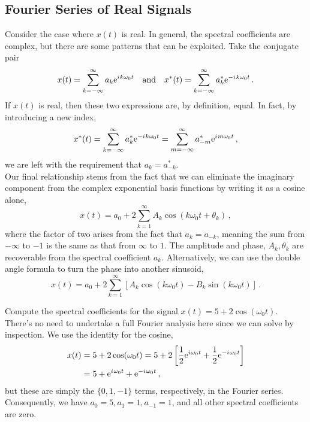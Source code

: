 \subsection{Fourier Series of Real Signals}
%
Consider the case where $x(t)$ is real. In general, the spectral coefficients are
complex, but there are some patterns that can be exploited. Take the conjugate pair
%
\begin{displaymath}
  x(t) = \sum_{k=-\infty}^\infty a_k \mathrm{e}^{{i\mkern1mu} k\omega_0 t}
  \quad\mathrm{and}\quad
  x^*(t) = \sum_{k=-\infty}^\infty a_k^* \mathrm{e}^{-{i\mkern1mu} k\omega_0 t} \,.
\end{displaymath}
%
If $x(t)$ is real, then these two expressions are, by definition, equal. In fact,
by introducing a new index,
%
\begin{displaymath}
  x^*(t) = \sum_{k=-\infty}^\infty a_k^*\mathrm{e}^{-{i\mkern1mu} k \omega_0 t}
  = \sum_{m=-\infty}^\infty a_{-m}^*\mathrm{e}^{{i\mkern1mu} m \omega_0 t} \,,
\end{displaymath}
%
we are left with the requirement that $a_k = a_{-k}^*$.\\
%
Our final relationship stems from the fact that we can eliminate the imaginary
component from the complex exponential basis functions by writing it as a cosine
alone,
%
\begin{displaymath}
  x(t) = a_0 + 2\sum_{k=1}^\infty A_k\cos(k\omega_0 t + \theta_k) \,,
\end{displaymath}
%
where the factor of two arises from the fact that $a_k = a_{-k}$, meaning the
sum from $-\infty$ to $-1$ is the same as that from $\infty$ to $1$. The amplitude
and phase, $A_k,\theta_k$ are recoverable from the spectral coefficient $a_k$.
Alternatively, we can use the double angle formula to turn the phase into
another sinusoid,
%
\begin{displaymath}
  x(t) = a_0 + 2\sum_{k=1}^\infty \left[A_k\cos(k\omega_0 t) - B_k\sin(k\omega_0 t)\right] \,.  
\end{displaymath}

\begin{exmp}
  Compute the spectral coefficients for the signal $x(t) = 5 + 2\cos(\omega_0 t)$.\\
  There's no need to undertake a full Fourier analysis here since we can
  solve by inspection. We use the identity for the cosine,
  \begin{align*}
    x(t) &= 5 + 2\cos(\omega_0 t) = 5 + 2\left[
      \frac{1}{2}\mathrm{e}^{{i\mkern1mu}\omega_0t} + \frac{1}{2}\mathrm{e}^{-{i\mkern1mu}\omega_0t}
    \right] \\
    &= 5 + \mathrm{e}^{{i\mkern1mu}\omega_0 t} + \mathrm{e}^{-{i\mkern1mu}\omega_0 t} \,,
  \end{align*}
  but these are simply the $\{0,1,-1\}$ terms, respectively, in the Fourier series.
  Consequently, we have $a_0 = 5, a_1 = 1, a_{-1} = 1$, and all other spectral
  coefficients are zero.
\end{exmp}

